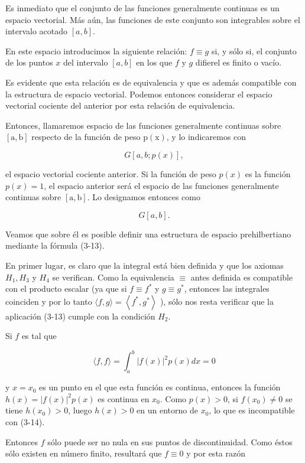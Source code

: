 \documentclass[10pt]{article}
\theoremstyle{plain}
\theoremstyle{definition}
\theoremstyle{remark}
\begin{document}
Es inmediato que el conjunto de las funciones generalmente continuas es un espacio vectorial. Más aún, las funciones de este conjunto son integrables sobre el intervalo acotado $[a, b]$.

En este espacio introducimos la siguiente relación: $f \equiv g$ si, y sólo si, el conjunto de los puntos $x$ del intervalo $[a, b]$ en los que $f$ y $g$ difierel es finito o vacío.

Es evidente que esta relación es de equivalencia y que es además compatible con la estructura de espacio vectorial. Podemos entonces considerar el espacio vectorial cociente del anterior por esta relación de equivalencia.

Entonces, llamaremos espacio de las funciones generalmente continuas sobre $[\mathrm{a}, \mathrm{b}]$ respecto de la función de peso $\mathrm{p}(\mathrm{x})$, y lo indicaremos con

$$
G[a, b ; p(x)],
$$

el espacio vectorial cociente anterior. Si la función de peso $p(x)$ es la función $p(x)=1$, el espacio anterior será el espacio de las funciones generalmente continuas sobre $[\mathrm{a}, \mathrm{b}]$. Lo designamos entonces como

$$
G[a, b] .
$$

Veamos que sobre él es posible definir una estructura de espacio prehilbertiano mediante la fórmula (3-13).

En primer lugar, es claro que la integral está bien definida y que los axiomas $H_{1}, H_{3}$ y $H_{4}$ se verifican. Como la equivalencia $\equiv$ antes definida es compatible con el producto escalar (ya que si $f \equiv f^{*}$ y $g \equiv g^{*}$, entonces las integrales coinciden y por lo tanto $\langle f, g\rangle=\left\langle f^{*}, g^{*}\right\rangle$ ), sólo nos resta verificar que la aplicación (3-13) cumple con la condición $H_{2}$.

Si $f$ es tal que


\begin{equation*}
\langle f, f\rangle=\int_{a}^{b}|f(x)|^{2} p(x) d x=0 \tag{3-14}
\end{equation*}


y $x=x_{0}$ es un punto en el que esta función es continua, entonces la función $h(x)=|f(x)|^{2} p(x)$ es continua en $x_{0}$. Como $p(x)>0$, si $f\left(x_{0}\right) \neq 0$ se tiene $h\left(x_{0}\right)>0$, luego $h(x)>0$ en un entorno de $x_{0}$, lo que es incompatible con (3-14).

Entonces $f$ sólo puede ser no nula en sus puntos de discontinuidad. Como éstos sólo existen en número finito, resultará que $f \equiv 0$ y por esta razón
\end{document}
